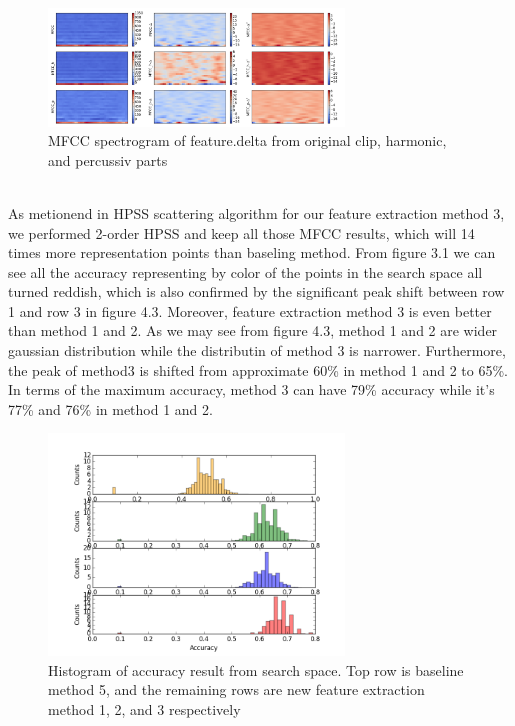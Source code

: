 \documentclass[final]{siamltexmm}
\begin{document}
\begin{figure}[!ht]
  \centering
    \includegraphics[width=0.7\textwidth]{../fig/HP_deltas1.png}
  \caption{MFCC spectrogram of feature.delta from original clip, harmonic, and percussiv parts}
\end{figure}

\\As metionend in HPSS scattering algorithm for our feature extraction method 3, we performed 2-order HPSS and keep all those MFCC results, which will 14 times more representation points than baseling method. From figure 3.1 we can see all the accuracy representing by color of the points in the search space all turned reddish, which is also confirmed by the significant peak shift between row 1 and row 3 in figure 4.3. Moreover, feature extraction method 3 is even better than method 1 and 2. As we may see from figure 4.3, method 1 and 2 are wider gaussian distribution while the distributin of method 3 is narrower. Furthermore, the peak of method3 is shifted from approximate 60\% in method 1 and 2 to 65\%. In terms of the maximum accuracy, method 3 can have 79\% accuracy while it's 77\% and 76\% in method 1 and 2.

\begin{figure}[!ht]
  \centering
    \includegraphics[width=0.7\textwidth]{../fig/histogram_n1.png}
  \caption{Histogram of accuracy result from search space. Top row is baseline method 5, and the remaining rows are new feature extraction method 1, 2, and 3 respectively}
\end{figure}
\end{document}
